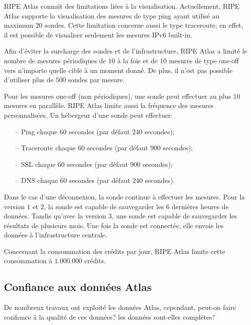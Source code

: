 RIPE Atlas connaît des limitations  liées à la visualisation. Actuellement, RIPE Atlas supporte la visualisation des mesures de type ping ayant utilisé au maximum $20$  sondes. Cette limitation concerne aussi le type traceroute, en effet,  il est possible de visualiser seulement les mesures IPv6 built-in.

Afin d'éviter la surcharge  des sondes et de l'infrastructure, RIPE Atlas a limité le nombre de mesures périodiques de $10$ à la fois et de $10$ mesures de type one-off vers n'importe quelle cible à un moment donné. De plus, il n'est pas possible d'utiliser  plus de $500$ sondes par mesure.

Pour les mesures one-off (non périodiques), une sonde peut effectuer au plus $10$ mesures en parallèle. RIPE Atlas limite aussi la fréquence des mesures personnalisées. Un hébergeur d'une sonde peut effectuer:

\begin{itemize}
	\item[--] Ping chaque $60$ secondes (par défaut  $240$ secondes);
	\item[--] Traceroute chaque $60$ secondes (par défaut  $900$ secondes);
	\item[--] SSL chaque $60$ secondes (par défaut  $900$ secondes);
	\item[--] DNS chaque $60$ secondes (par défaut $240$ secondes).
	
\end{itemize}

Dans le cas d'une déconnexion, la sonde continue à effectuer les mesures. Pour la version $1$ et $2$, la sonde est capable de sauvegarder les  $6$ dernières heures de données. Tandis qu'avec  la  version $3$, une sonde est capable de sauvegarder les résultats de plusieurs mois. Une fois la sonde est connectée, elle envoie les  données à l'infrastructure centrale.

Concernant la consommation des crédits par jour, RIPE Atlas limite cette consommation à  $1.000.000$ crédits.


\subsection{Confiance aux données Atlas}

De nombreux travaux ont exploité les données Atlas, cependant, peut-on faire confiance à la qualité de ces données? les données sont-elles complètes?

